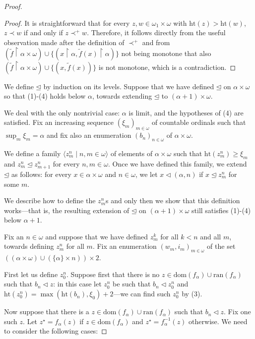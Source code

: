 \documentclass[10pt,a4paper]{amsart}
\begin{document}
\begin{proof}
\begin{proof}
It is straightforward that for every $z,w \in \omega_1\times \omega$ with $\mathrm{ht}(z) > \mathrm{ht}(w)$, $z \prec w$ if and only if $z \prec^+ w$. Therefore, it follows directly from the useful observation made after the definition of $\prec^+$ and from $(\tilde{f} \upharpoonright \alpha \times \omega) \cup \{(x \upharpoonright \alpha, \tilde{f}(x) \upharpoonright \alpha)\}$ not being monotone that also $(\tilde{f} \upharpoonright \alpha \times \omega) \cup \{(x, \tilde{f}(x))\}$ is not monotone, which is a contradiction.
\end{proof}

We define $\unlhd$ by induction on its levels. Suppose that we have defined $\unlhd$ on $\alpha \times \omega$ so that (1)-(4) holds below $\alpha$, towards extending $\unlhd$ to $(\alpha+1) \times \omega$.

We deal with the only nontrivial case: $\alpha$ is limit, and the hypotheses of (4) are satisfied. Fix an increasing sequence $(\xi_m)_{m\in\omega}$ of countable ordinals such that $\sup_m \xi_m = \alpha$ and fix also an enumeration $(b_n)_{n\in\omega}$ of $\alpha \times \omega$.

We define a family $\langle z^n_m \mid n,m\in\omega\rangle$ of elements of $\alpha \times \omega$ such that $\mathrm{ht}(z^n_m) \ge \xi_m$ and $z^n_{m} \unlhd z^n_{m+1}$ for every $n,m\in\omega$. Once we have defined this family, we extend $\unlhd$ as follows: for every $x \in \alpha \times \omega$ and $n\in\omega$, we let $x \lhd (\alpha, n)$ if $x \unlhd z^n_m$ for some $m$.

We describe how to define the $z^{n}_m$s and only then we show that this definition works---that is, the resulting extension of $\unlhd$ on $(\alpha+1) \times \omega$ still satisfies (1)-(4) below $\alpha+1$.

Fix an $n\in\omega$ and suppose that we have defined $z^k_m$ for all $k < n$ and all $m$, towards defining $z^{n}_m$ for all $m$. Fix an enumeration $(w_m, i_m)_{m\in\omega}$ of the set $((\alpha \times \omega) \cup (\{\alpha\} \times n))\times 2$.


First let us define $z_0^n$. Suppose first that there is no $z \in \mathrm{dom}(f_\alpha) \cup \mathrm{ran}(f_\alpha)$ such that  $b_n \lhd z$: in this case let $z_0^n$ be such that $b_n \lhd z_0^n$ and $\mathrm{ht}(z_0^n) = \max(\mathrm{ht}(b_n), \xi_0)+2$---we can find such $z_0^n$ by (3). 

Now suppose that there is a $z \in \mathrm{dom}(f_\alpha) \cup \mathrm{ran}(f_\alpha)$ such that  $b_n \lhd z$. Fix one such $z$. Let $z^\star = f_\alpha(z)$ if $z \in \mathrm{dom}(f_\alpha)$ and $z^\star = f_{\alpha}^{-1}(z)$ otherwise.  We need to consider the following cases:


\end{proof}
\end{document}

